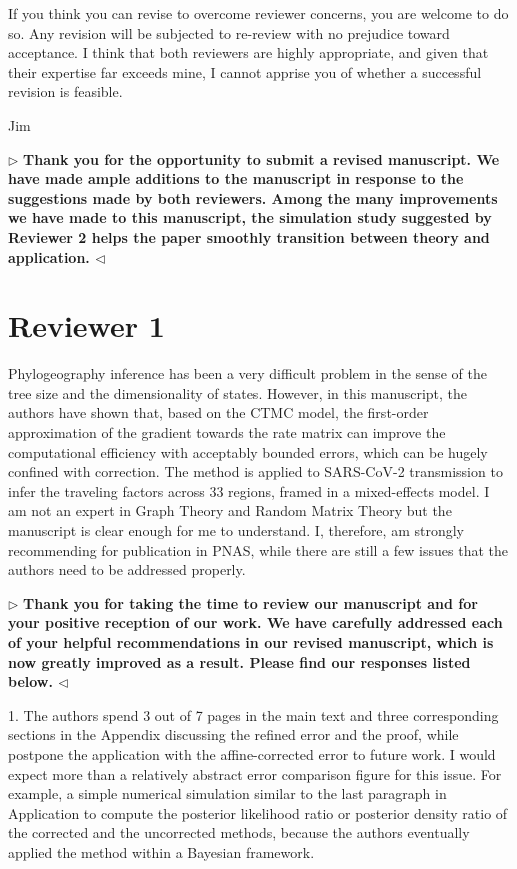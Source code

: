 \documentclass[12pt]{article}
\newenvironment{reply}{$\triangleright$\bfseries}{$\triangleleft$}
\begin{document}
If you think you can revise to overcome reviewer concerns, you are welcome to do so. Any revision will be subjected to re-review with no prejudice toward acceptance. I think that both reviewers are highly appropriate, and given that their expertise far exceeds mine, I cannot apprise you of whether a successful revision is feasible. 

Jim 

\begin{reply}
	Thank you for the opportunity to submit a revised manuscript. We have made ample additions to the manuscript in response to the suggestions made by both reviewers. Among the many improvements we have made to this manuscript, the simulation study suggested by Reviewer 2 helps the paper smoothly transition between theory and application.
\end{reply}


\section*{Reviewer 1}

Phylogeography inference has been a very difficult problem in the sense of the tree size and the dimensionality of states. However, in this manuscript, the authors have shown that, based on the CTMC model, the first-order approximation of the gradient towards the rate matrix can improve the computational efficiency with acceptably bounded errors, which can be hugely confined with correction. The method is applied to SARS-CoV-2 transmission to infer the traveling factors across 33 regions, framed in a mixed-effects model. I am not an expert in Graph Theory and Random Matrix Theory but the manuscript is clear enough for me to understand. I, therefore, am strongly recommending for publication in PNAS, while there are still a few issues that the authors need to be addressed properly.

\begin{reply}
	Thank you for taking the time to review our manuscript and for your positive reception of our work.  We have carefully addressed each of your helpful recommendations in our revised manuscript, which is now greatly improved as a result.  Please find our responses listed below.
\end{reply}

1. The authors spend 3 out of 7 pages in the main text and three corresponding sections in the Appendix discussing the refined error and the proof, while postpone the application with the affine-corrected error to future work. I would expect more than a relatively abstract error comparison figure for this issue. For example, a simple numerical simulation similar to the last paragraph in Application to compute the posterior likelihood ratio or posterior density ratio of the corrected and the uncorrected methods, because the authors eventually applied the method within a Bayesian framework.
\end{document}
